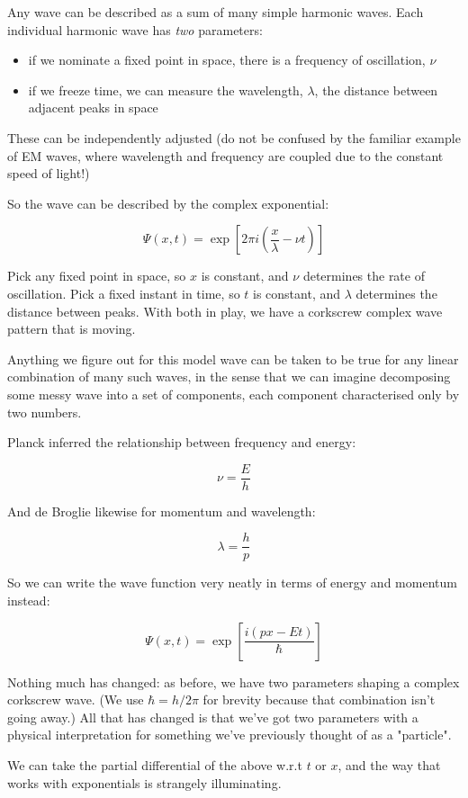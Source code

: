 Any wave can be described as a sum of many simple harmonic waves. Each individual harmonic wave has \textit{two} parameters:

\begin{itemize}
  \item if we nominate a fixed point in space, there is a frequency of oscillation, $\nu$
  \item if we freeze time, we can measure the wavelength, $\lambda$, the distance between adjacent peaks in space
\end{itemize}

These can be independently adjusted (do not be confused by the familiar example of EM waves, where wavelength and frequency are coupled due to the constant speed of light!)

So the wave can be described by the complex exponential:

$$
\Psi(x, t) = \exp \left[ 2\pi i(\frac{x}{\lambda} - \nu t) \right]
$$

Pick any fixed point in space, so $x$ is constant, and $\nu$ determines the rate of oscillation. Pick a fixed instant in time, so $t$ is constant, and $\lambda$ determines the distance between peaks. With both in play, we have a corkscrew complex wave pattern that is moving.

Anything we figure out for this model wave can be taken to be true for any linear combination of many such waves, in the sense that we can imagine decomposing some messy wave into a set of components, each component characterised only by two numbers.

Planck inferred the relationship between frequency and energy:

$$\nu = \frac{E}{h}$$

And de Broglie likewise for momentum and wavelength:

$$\lambda = \frac{h}{p}$$

So we can write the wave function very neatly in terms of energy and momentum instead:

$$
\Psi(x, t) = \exp \left[ {\frac{i(px - Et)}{\hbar}} \right]
$$

Nothing much has changed: as before, we have two parameters shaping a complex corkscrew wave. (We use $\hbar = h/2\pi$ for brevity because that combination isn't going away.) All that has changed is that we've got two parameters with a physical interpretation for something we've previously thought of as a "particle".

We can take the partial differential of the above w.r.t $t$ or $x$, and the way that works with exponentials is strangely illuminating.

